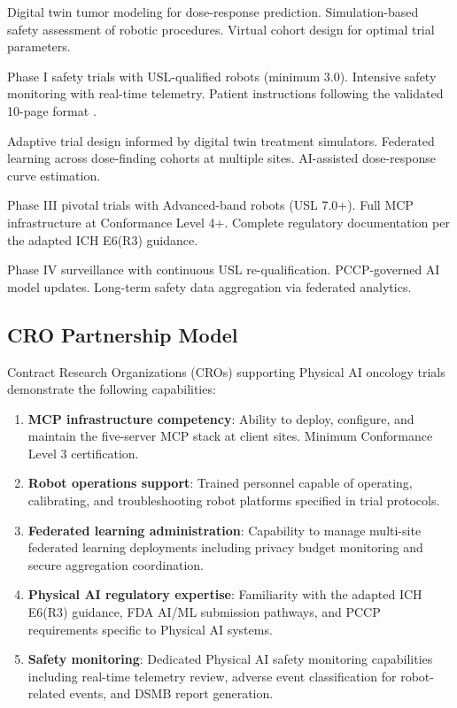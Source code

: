 \documentclass[11pt,letterpaper]{article}
\begin{document}
\begin{description}[leftmargin=3.5cm, style=sameline]
  \item[IND-Enabling] Digital twin tumor modeling for dose-response prediction. Simulation-based safety assessment of robotic procedures. Virtual cohort design for optimal trial parameters.

  \item[First-in-Human] Phase I safety trials with USL-qualified robots (minimum 3.0). Intensive safety monitoring with real-time telemetry. Patient instructions following the validated 10-page format \cite{kawchak2026patient}.

  \item[Dose-Finding] Adaptive trial design informed by digital twin treatment simulators. Federated learning across dose-finding cohorts at multiple sites. AI-assisted dose-response curve estimation.

  \item[Registration] Phase III pivotal trials with Advanced-band robots (USL 7.0+). Full MCP infrastructure at Conformance Level 4+. Complete regulatory documentation per the adapted ICH E6(R3) guidance.

  \item[Post-Market] Phase IV surveillance with continuous USL re-qualification. PCCP-governed AI model updates. Long-term safety data aggregation via federated analytics.
\end{description}

\subsection{CRO Partnership Model}

Contract Research Organizations (CROs) supporting Physical AI oncology trials \SHALL{} demonstrate the following capabilities:

\begin{enumerate}
  \item \textbf{MCP infrastructure competency}: Ability to deploy, configure, and maintain the five-server MCP stack at client sites. Minimum Conformance Level 3 certification.
  \item \textbf{Robot operations support}: Trained personnel capable of operating, calibrating, and troubleshooting robot platforms specified in trial protocols.
  \item \textbf{Federated learning administration}: Capability to manage multi-site federated learning deployments including privacy budget monitoring and secure aggregation coordination.
  \item \textbf{Physical AI regulatory expertise}: Familiarity with the adapted ICH E6(R3) guidance, FDA AI/ML submission pathways, and PCCP requirements specific to Physical AI systems.
  \item \textbf{Safety monitoring}: Dedicated Physical AI safety monitoring capabilities including real-time telemetry review, adverse event classification for robot-related events, and DSMB report generation.
\end{enumerate}
\end{document}
